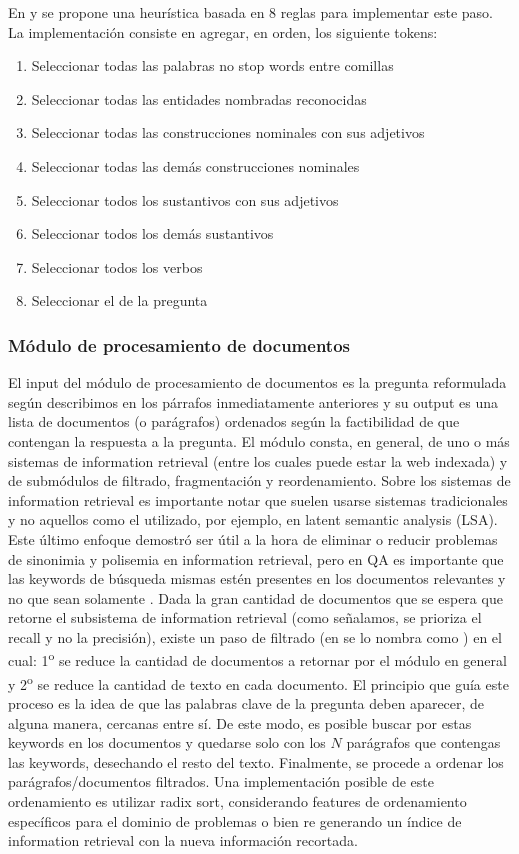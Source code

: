 En \cite{QA1} y \cite{QA3} se propone una heurística basada en 8 reglas para implementar este paso. La implementación consiste en agregar, en orden, los siguiente tokens:

\begin{enumerate}
\item Seleccionar todas las palabras no stop words entre comillas
\item Seleccionar todas las entidades nombradas reconocidas
\item Seleccionar todas las construcciones nominales con sus adjetivos
\item Seleccionar todas las demás construcciones nominales
\item Seleccionar todos los sustantivos con sus adjetivos
\item Seleccionar todos los demás sustantivos
\item Seleccionar todos los verbos
\item Seleccionar el  de la pregunta
\end{enumerate}

\subsubsection*{Módulo de procesamiento de documentos}
El input del módulo de procesamiento de documentos es la pregunta reformulada según describimos en los párrafos inmediatamente anteriores y su output es una lista de documentos (o parágrafos) ordenados según la factibilidad de que contengan la respuesta a la pregunta. El módulo consta, en general, de uno o más sistemas de information retrieval (entre los cuales puede estar la web indexada) y de submódulos de filtrado, fragmentación y reordenamiento. Sobre los sistemas de information retrieval es importante notar que suelen usarse sistemas tradicionales y no aquellos como el utilizado, por ejemplo, en latent semantic analysis (LSA). Este último enfoque demostró ser útil a la hora de eliminar o reducir problemas de sinonimia y polisemia en information retrieval, pero en QA es importante que las keywords de búsqueda mismas estén presentes en los documentos relevantes y no que sean solamente . Dada la gran cantidad de documentos que se espera que retorne el subsistema de information retrieval (como señalamos, se prioriza el recall y no la precisión), existe un paso de filtrado (en \cite{WATSON1} se lo nombra como ) en el cual: 1\textsuperscript{o} se reduce la cantidad de documentos a retornar por el módulo en general y 2\textsuperscript{o} se reduce la cantidad de texto en cada documento. El principio que guía este proceso es la idea de que las palabras clave de la pregunta deben aparecer, de alguna manera, cercanas entre sí. De este modo, es posible buscar por estas keywords en los documentos y quedarse solo con los $N$ parágrafos que contengas las keywords, desechando el resto del texto. Finalmente, se procede a ordenar los parágrafos/documentos filtrados. Una implementación posible de este ordenamiento es utilizar radix sort, considerando features de ordenamiento específicos para el dominio de problemas o bien re generando un índice de information retrieval con la nueva información recortada.


